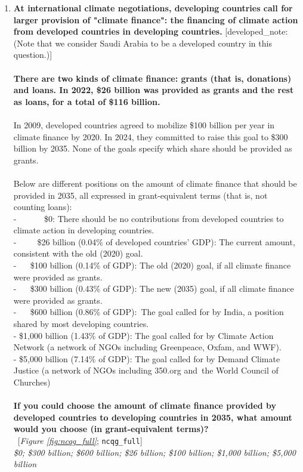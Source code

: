 \begin{enumerate}[resume]
\item  \label{q:ncqg_full} \textbf{At international climate negotiations, developing countries call for larger provision of "climate finance": the financing of climate action from developed countries in developing countries.} [developed\_note: (Note that we consider Saudi Arabia to be a developed country in this question.)]\\\\\textbf{There are two kinds of climate finance: grants (that is, donations) and loans. In 2022, \$26 billion was provided as grants and the rest as loans, for a total of \$116 billion.~}\\\\In 2009, developed countries agreed to mobilize \$100 billion per year in climate finance by 2020. In 2024, they committed to raise this goal to \$300 billion by 2035. None of the goals specify which share should be provided as grants.\\\\Below are different positions on the amount of climate finance that should be provided in 2035, all expressed in grant-equivalent terms (that is, not counting loans):\\-~ ~ ~ ~ \$0: There should be no contributions from developed countries to climate action in developing countries.\\-~ ~ ~ \$26 billion (0.04\% of developed countries' GDP): The current amount, consistent with the old (2020) goal.\\-~ ~ \$100 billion (0.14\% of GDP): The old (2020) goal, if all climate finance were provided as grants.\\-~ ~ \$300 billion (0.43\% of GDP): The new (2035) goal, if all climate finance were provided as grants.\\-~ ~ \$600 billion (0.86\% of GDP):~The goal called for by India, a position shared by most developing countries.\\- \$1,000 billion (1.43\% of GDP): The goal called for by Climate Action Network (a network of NGOs including Greenpeace, Oxfam, and WWF).\\- \$5,000 billion (7.14\% of GDP): The goal called for by Demand Climate Justice (a network of NGOs including 350.org and~the World Council of Churches)\\\\\textbf{If you could choose the amount of climate finance provided by developed countries to developing countries in 2035, what amount would you choose (in grant-equivalent terms)?}\\ 
~[\textit{Figure \ref{fig:ncqg_full}}; 
\verb|ncqg_full|]
  \\ \textit{\$0; \$300 billion; \$600 billion; \$26 billion; \$100 billion; \$1,000 billion; \$5,000 billion}


\end{enumerate}
